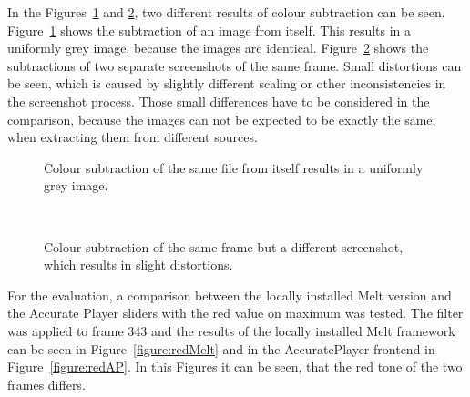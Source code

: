 \documentclass[../MasterThesis.tex]{subfiles}
\begin{document}
In the Figures~\ref{figure:greyresult_unit} and \ref{figure:greyresult_blurry}, two different results of colour subtraction can be seen. Figure~\ref{figure:greyresult_unit} shows the subtraction of an image from itself. This results in a uniformly grey image, because the images are identical. Figure~\ref{figure:greyresult_blurry} shows the subtractions of two separate screenshots of the same frame. Small distortions can be seen, which is caused by slightly different scaling or other inconsistencies in the screenshot process. Those small differences have to be considered in the comparison, because the images can not be expected to be exactly the same, when extracting them from different sources.


\begin{minipage}{0.48\textwidth}
	
	\begin{figure}[H]
		\begin{center}
			\caption[Colour subtraction of the same file from itself.]{Colour subtraction of the same file from itself results in a uniformly grey image.}
			\label{figure:greyresult_unit}
		\end{center}
	\end{figure}
\end{minipage}\begin{minipage}{0.04\textwidth}
	\ 
\end{minipage}\begin{minipage}{0.48\textwidth}	
	\begin{figure}[H]
		\begin{center}
			\caption[Colour subtraction of the same frame but a different screenshot.]{Colour subtraction of the same frame but a different screenshot, which results in slight distortions.}
			\label{figure:greyresult_blurry}
		\end{center}
	\end{figure}
\end{minipage}

\vspace*{2em}
For the evaluation, a comparison between the locally installed Melt version and the Accurate Player sliders with the red value on maximum was tested. The filter was applied to frame 343 and the results of the locally installed Melt framework can be seen in Figure~\ref{figure:redMelt} and in the AccuratePlayer frontend in Figure~\ref{figure:redAP}. In this Figures it can be seen, that the red tone of the two frames differs.
\end{document}
